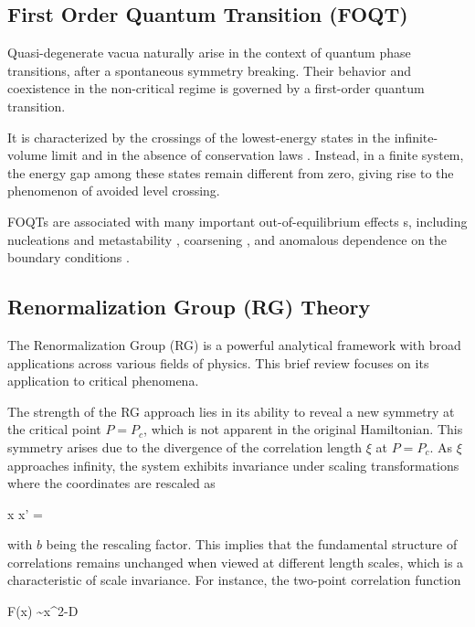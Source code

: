 \subsection{First Order Quantum Transition (FOQT)}
\label{FOQTeq}

Quasi-degenerate vacua naturally arise in the context of quantum phase transitions, after a spontaneous symmetry breaking. Their behavior and coexistence in the non-critical regime is governed by a first-order quantum transition.

It is characterized by the crossings of the lowest-energy states in the infinite-volume limit and in the absence of conservation laws \cite{plissetto2023scaling}.
Instead, in a finite system, the energy gap among these states remain different from zero, giving rise to the phenomenon of avoided level crossing.

FOQTs are associated with many important out-of-equilibrium effects s, including nucleations and metastability \cite{binder1987theory,bray2002theory}, coarsening \cite{chandran2012kibble}, and anomalous dependence on the boundary conditions \cite{pelissetto2020scaling,panagopoulos2018dynamic,campostrini2015quantum,pelissetto2018finite,rossini2018ground}.

\subsection{Renormalization Group (RG) Theory}

The Renormalization Group (RG) is a powerful analytical framework with broad applications across various fields of physics. This brief review focuses on its application to critical phenomena.

The strength of the RG approach lies in its ability to reveal a new symmetry at the critical point $ P = P_c $, which is not apparent in the original Hamiltonian. This symmetry arises due to the divergence of the correlation length $ \xi $ at $ P = P_c $. As $ \xi $ approaches infinity, the system exhibits invariance under scaling transformations where the coordinates are rescaled as 

x \rightarrow x' = 
\ea

with $ b $ being the rescaling factor. This implies that the fundamental structure of correlations remains unchanged when viewed at different length scales, which is a characteristic of scale invariance. For instance, the two-point correlation function 

F(x) \sim x^{2-D}
\ea

